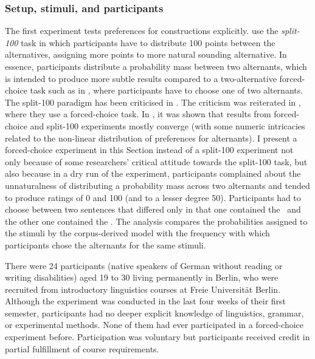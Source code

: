 \subsubsection{Setup, stimuli, and participants}

The first experiment tests preferences for constructions explicitly.
\cite{FordBresnan2013} use the \textit{split-100} task in which participants have to distribute 100 points between the alternatives, assigning more points to more natural sounding alternative.
In essence, participants distribute a probability mass between two alternants, which is intended to produce more subtle results compared to a two-alternative forced-choice task such as in \cite{Rosenbach2013}, where participants have to choose one of two alternants.
The split-100 paradigm has been criticised in \cite{ArppeJaervikivi2007}.
The criticism was reiterated in \cite{DivjakEa2016}, where they use a forced-choice task.
In \cite{VerhoevenTemme2017}, it was shown that results from forced-choice and split-100 experiments mostly converge (with some numeric intricacies related to the non-linear distribution of preferences for alternants).
I present a forced-choice experiment in this Section instead of a split-100 experiment not only because of some researchers' critical attitude towards the split-100 task, but also because in a dry run of the experiment, participants complained about the unnaturalness of distributing a probability mass across two alternants and tended to produce ratings of 0 and 100 (and to a lesser degree 50).
Participants had to choose between two sentences that differed only in that one contained the \NACa\, and the other one contained the \PGCa.
The analysis compares the probabilities assigned to the stimuli by the corpus-derived model with the frequency with which participants chose the alternants for the same stimuli.

There were 24 participants (native speakers of German without reading or writing disabilities) aged 19 to 30 living permanently in Berlin, who were recruited from introductory linguistics courses at Freie Universität Berlin.
Although the experiment was conducted in the last four weeks of their first semester, participants had no deeper explicit knowledge of linguistics, grammar, or experimental methods.
None of them had ever participated in a forced-choice experiment before.
Participation was voluntary but participants received credit in partial fulfillment of course requirements.

